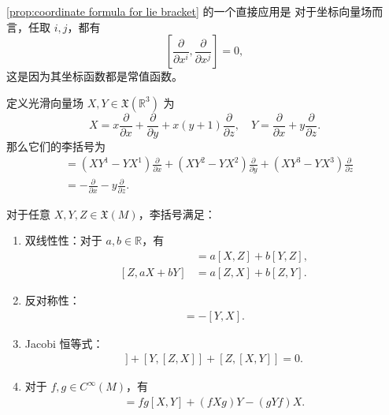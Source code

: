 \autoref{prop:coordinate formula for lie bracket} 的一个直接应用是
对于坐标向量场而言，任取 $i,j$，都有
\[
  \left[\frac{\partial}{\partial x^i},\frac{\partial}{\partial x^j}\right]  
  =0,
\]
这是因为其坐标函数都是常值函数。

\begin{example}
  定义光滑向量场 $X,Y\in \mathfrak{X}(\mathbb{R}^3)$ 为
  \[
    X=x\frac{\partial}{\partial x}+\frac{\partial}{\partial y}
    +x(y+1)\frac{\partial }{\partial z},
    \quad 
    Y=\frac{\partial}{\partial x}+y\frac{\partial }{\partial z}.   
  \]
  那么它们的李括号为
  \begin{align*}
    [X,Y]&= \left(XY^1-YX^1\right)\frac{\partial}{\partial x}
    +\left(XY^2-YX^2\right)\frac{\partial}{\partial y}
    +\left(XY^3-YX^3\right)\frac{\partial}{\partial z}\\
    &=-\frac{\partial}{\partial x}-y\frac{\partial}{\partial z}.
  \end{align*}
\end{example}

\begin{proposition}[李括号的性质]
  对于任意 $X,Y,Z\in \mathfrak{X}(M)$，李括号满足：
  \begin{enumerate}
    \item 双线性性：对于 $a,b\in \mathbb{R}$，有
    \begin{align*}
      [aX+bY,Z]&=a[X,Z]+b[Y,Z],\\
      [Z,aX+bY]&=a[Z,X]+b[Z,Y].
    \end{align*}
    \item 反对称性：
    \begin{align*}
      [X,Y]=-[Y,X].
    \end{align*}
    \item Jacobi 恒等式：
    \begin{align*}
      [X,[Y,Z]]+[Y,[Z,X]]+[Z,[X,Y]]=0.
    \end{align*}
    \item 对于 $f,g\in C^\infty(M)$，有
    \begin{align*}
      [fX,gY]=fg[X,Y]+(fXg)Y-(gYf)X.
    \end{align*}
  \end{enumerate}
\end{proposition}


